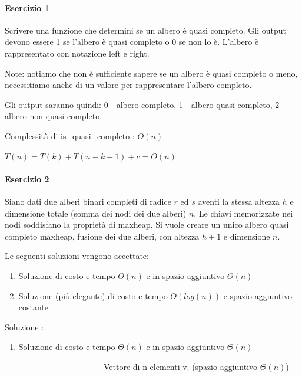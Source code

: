 \documentclass[tikz]{article}
\providecommand{\tightlist}{%
  \setlength{\itemsep}{0pt}\setlength{\parskip}{0pt}}
\let\oldparagraph\paragraph
\renewcommand{\paragraph}[1]{\oldparagraph{#1}\mbox{}}
\begin{document}
\paragraph{Esercizio 1}

{Scrivere una funzione che determini se un albero è quasi completo. Gli output devono essere 1 se l'albero è quasi completo o 0 se non lo è. }{L'albero è rappresentato con notazione left e right.}

{Note: notiamo che non è sufficiente sapere se un albero è quasi completo o meno, necessitiamo anche di un valore per rappresentare l'albero completo.}

{Gli output saranno quindi: 0 - albero completo, 1 - albero quasi completo, 2 - albero non quasi completo.}





{Complessità di is\_quasi\_completo : $O(n)$}

$T(n) = T(k) + T(n-k-1) + c = O(n)$

\paragraph{Esercizio 2}

{Siano dati due alberi binari completi di radice $r$ ed $s$ aventi la stessa altezza $h$ e dimensione totale (somma dei nodi dei due alberi) $n$. Le chiavi memorizzate nei nodi soddisfano la proprietà di maxheap. Si vuole creare un unico albero quasi completo maxheap, fusione dei due alberi, con altezza $h+1$ e dimensione $n$.}

{Le seguenti soluzioni vengono accettate:}

\begin{enumerate}
\tightlist
\item
  {Soluzione di costo e tempo $\Theta(n)$ e in spazio aggiuntivo $\Theta(n)$}
\item
  {Soluzione (più elegante) di costo e tempo $O(log(n))$ e spazio aggiuntivo costante}
\end{enumerate}

{Soluzione :}

\begin{enumerate}
\tightlist
\item
  {Soluzione di costo e tempo $\Theta(n)$ e in spazio aggiuntivo $\Theta(n)$}
\end{enumerate}

{~~~~~~~~~~~~~~~~~~~~~~~~Vettore di n elementi v. (spazio aggiuntivo $\Theta(n)$)}
\end{document}

